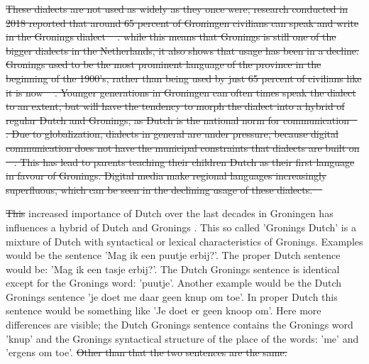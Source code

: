 \documentclass[
10pt, %
a4paper, %
oneside, %
headinclude,footinclude, %
] {book}%
\providecommand{\DIFadd}[1]{{\protect\color{blue}\uwave{#1}}} %
\providecommand{\DIFdel}[1]{{\protect\color{red}\sout{#1}}}                      %
\providecommand{\DIFaddbegin}{} %
\providecommand{\DIFaddend}{} %
\providecommand{\DIFdelbegin}{} %
\providecommand{\DIFdelend}{} %
\begin{document}
\DIFdel{These dialects are not used as widely as they once were; research conducted in 2018 reported that around 65 percent of Groningen civilians can speak and write in the Gronings dialect \mbox{%
\citep{Sprekers}}\hspace{0pt}%
. while this means that Gronings is still one of the bigger dialects in the Netherlands, it also shows that usage has been in a decline. Gronings used to be the most prominent language of the province in the beginning of the 1900's, rather than being used by just 65 percent of civilians like it is now \mbox{%
\citep{Sprekers}}\hspace{0pt}%
. Younger generations in Groningen can often times speak the dialect to an extent, but will have the tendency to morph the dialect into a hybrid of regular Dutch and Gronings, as Dutch is the national norm for communication \mbox{%
\citep{streektalen}}\hspace{0pt}%
. Due to globalization, dialects in general are under pressure, because digital communication does not have the municipal constraints that dialects are built on \mbox{%
\citep{globalization}}\hspace{0pt}%
. This has lead to parents teaching their children Dutch as their first language in favour of  Gronings. Digital media make regional languages increasingly superfluous, which can be seen in the declining usage of these dialects.\mbox{%
\citep{globalization} 
}\hspace{0pt}%
}\DIFdelend 

\DIFdelbegin \DIFdel{This }\DIFdelend \DIFaddbegin \DIFadd{The }\DIFaddend increased importance of Dutch over the last decades in Groningen has influences a hybrid of Dutch and Gronings \citep{globalization}. This so called 'Gronings Dutch' is a mixture of Dutch with syntactical or lexical characteristics of Gronings.  Examples would be the sentence 'Mag ik een puutje erbij?'. The proper Dutch sentence would be: 'Mag ik een tasje erbij?'. The Dutch Gronings sentence is identical except for the Gronings word: 'puutje'. Another example would be the Dutch Gronings sentence 'je doet me daar geen knup om toe'. In proper Dutch this sentence would be something like 'Je doet er geen knoop om'. Here more differences are visible; the Dutch Gronings sentence contains the Gronings word 'knup' and the Gronings syntactical structure of the place of the words: 'me' and 'ergens om toe'. 
\DIFdelbegin \DIFdel{Other than that the two sentences are the same.
}%
\end{document}
